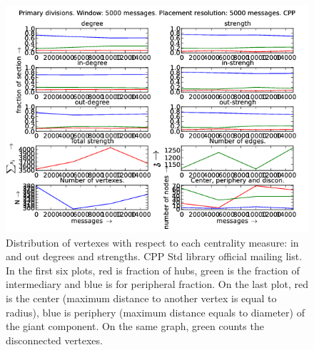\documentclass[%
 aip,
 jmp,%
 amsmath,amssymb,
 reprint,%
]{revtex4-1}
\begin{document}
\begin{figure}[hbtp] 
   \centering
        \includegraphics[width=\textwidth]{figs/CPP/5000}
    \caption{Distribution of vertexes with respect to each centrality measure: in and out degrees and strengths. CPP Std library official mailing list. In the first six plots, red is fraction of hubs, green is the fraction of intermediary and blue is for peripheral fraction. On the last plot, red is the center (maximum distance to another vertex is equal to radius), blue is periphery (maximum distance equals to diameter) of the giant component. On the same graph, green counts the disconnected vertexes.}
    \label{fig:cpp5000}
\end{figure}
\end{document}
